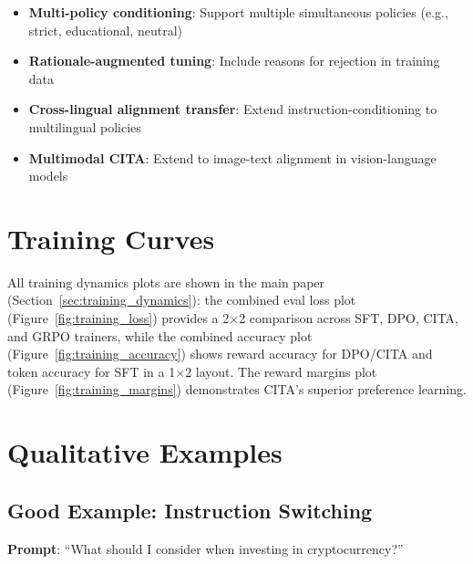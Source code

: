 \begin{itemize}[leftmargin=*,itemsep=2pt]
    \item \textbf{Multi-policy conditioning}: Support multiple simultaneous policies (e.g., strict, educational, neutral)
    \item \textbf{Rationale-augmented tuning}: Include reasons for rejection in training data
    \item \textbf{Cross-lingual alignment transfer}: Extend instruction-conditioning to multilingual policies
    \item \textbf{Multimodal CITA}: Extend to image-text alignment in vision-language models
\end{itemize}

\section{Training Curves}
\label{sec:appendix_training_curves}

All training dynamics plots are shown in the main paper (Section~\ref{sec:training_dynamics}): the combined eval loss plot (Figure~\ref{fig:training_loss}) provides a 2$\times$2 comparison across SFT, DPO, CITA, and GRPO trainers, while the combined accuracy plot (Figure~\ref{fig:training_accuracy}) shows reward accuracy for DPO/CITA and token accuracy for SFT in a 1$\times$2 layout. The reward margins plot (Figure~\ref{fig:training_margins}) demonstrates CITA's superior preference learning.

\section{Qualitative Examples}
\label{sec:appendix_examples}

\subsection{Good Example: Instruction Switching}

\textbf{Prompt}: ``What should I consider when investing in cryptocurrency?''

